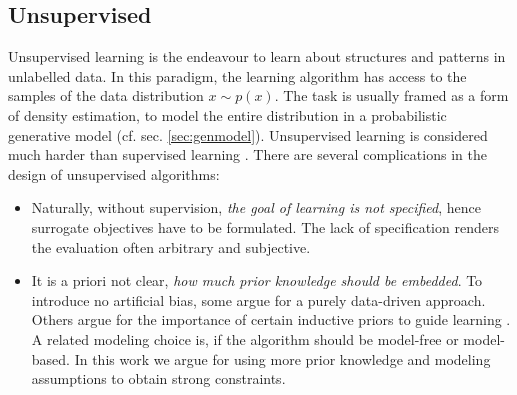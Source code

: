 	\subsection{Unsupervised}\label{sec:unsupervised}
		{Unsupervised learning} is the endeavour to learn about structures and patterns in unlabelled data. In this paradigm, the learning algorithm has access to the samples of the data distribution $x \sim p(x)$. The task is usually framed as a form of density estimation, \ie to model the entire distribution in a probabilistic generative model (cf. sec. \ref{sec:genmodel}).
		Unsupervised learning is considered much harder than supervised learning \cite{bishop06ml}. There are several complications in the design of unsupervised algorithms:
		\begin{itemize}
			\item Naturally, without supervision, \textit{the goal of learning is not specified}, hence surrogate objectives have to be formulated. The lack of specification renders the evaluation often arbitrary and subjective.
			\item It is a priori not clear, \textit{how much prior knowledge should be embedded}. To introduce no artificial bias, some argue for a purely data-driven approach. Others argue for the importance of certain inductive priors to guide learning \cite{tenenbaum18think}.
			A related modeling choice is, if the algorithm should be model-free or model-based.
			{In this work we argue for using more prior knowledge and modeling assumptions to obtain strong constraints.}

		\end{itemize}

